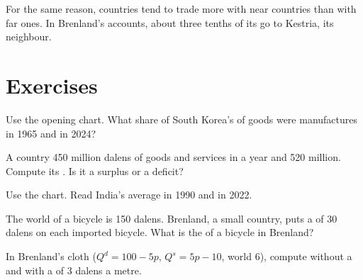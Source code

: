 For the same reason, countries tend to trade more with near countries than with far ones. In Brenland's
accounts, about three tenths of its  go to Kestria, its neighbour.

\section{Exercises}

\begin{exercise}[$\star$]\label{exo:g9:international-trade:1}
Use the opening chart. What share of South Korea's  of goods were manufactures in 1965 and in
2024?
\end{exercise}

\begin{exercise}[$\star$]\label{exo:g9:international-trade:2}
A country  450 million dalens of goods and services in a year and  520 million. Compute its
. Is it a surplus or a deficit?
\end{exercise}

\begin{exercise}[$\star$]\label{exo:g9:international-trade:3}
Use the  chart. Read India's average  in 1990 and in 2022.
\end{exercise}

\begin{exercise}[$\star$]\label{exo:g9:international-trade:4}
The world  of a bicycle is 150 dalens. Brenland, a small country, puts a  of 30 dalens on each
imported bicycle. What is the  of a bicycle in Brenland?
\end{exercise}

\begin{exercise}[$\star\star$]\label{exo:g9:international-trade:5}
In Brenland's cloth  ($Q^d = 100 - 5p$, $Q^s = 5p - 10$, world  6), compute  without a
 and with a  of 3 dalens a metre.
\end{exercise}

